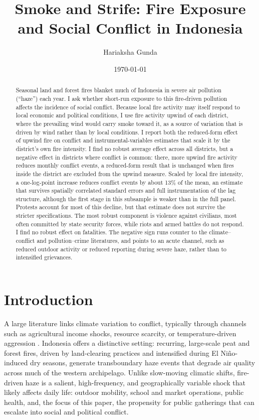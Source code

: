 \documentclass[12pt]{article}
\title{Smoke and Strife: Fire Exposure and Social Conflict in Indonesia}
\author{Hariaksha Gunda}
\affil{The University of Alabama}
\date{\today}
\begin{document}
\maketitle

\begin{abstract}
Seasonal land and forest fires blanket much of Indonesia in severe air pollution (``haze'') each year. I ask whether short-run exposure to this fire-driven pollution affects the incidence of social conflict. Because local fire activity may itself respond to local economic and political conditions, I use fire activity upwind of each district, where the prevailing wind would carry smoke toward it, as a source of variation that is driven by wind rather than by local conditions. I report both the reduced-form effect of upwind fire on conflict and instrumental-variables estimates that scale it by the district's own fire intensity. I find no robust average effect across all districts, but a negative effect in districts where conflict is common: there, more upwind fire activity reduces monthly conflict events, a reduced-form result that is unchanged when fires inside the district are excluded from the upwind measure. Scaled by local fire intensity, a one-log-point increase reduces conflict events by about 13\% of the mean, an estimate that survives spatially correlated standard errors and full instrumentation of the lag structure, although the first stage in this subsample is weaker than in the full panel. Protests account for most of this decline, but that estimate does not survive the stricter specifications. The most robust component is violence against civilians, most often committed by state security forces, while riots and armed battles do not respond. I find no robust effect on fatalities. The negative sign runs counter to the climate--conflict and pollution--crime literatures, and points to an acute channel, such as reduced outdoor activity or reduced reporting during severe haze, rather than to intensified grievances.
\end{abstract}

\section{Introduction}

A large literature links climate variation to conflict, typically through channels such as agricultural income shocks, resource scarcity, or temperature-driven aggression \citep{hsiang2013quantifying}. Indonesia offers a distinctive setting: recurring, large-scale peat and forest fires, driven by land-clearing practices and intensified during El Ni\~{n}o-induced dry seasons, generate transboundary haze events that degrade air quality across much of the western archipelago. Unlike slow-moving climatic shifts, fire-driven haze is a salient, high-frequency, and geographically variable shock that likely affects daily life: outdoor mobility, school and market operations, public health, and, the focus of this paper, the propensity for public gatherings that can escalate into social and political conflict.
\end{document}
